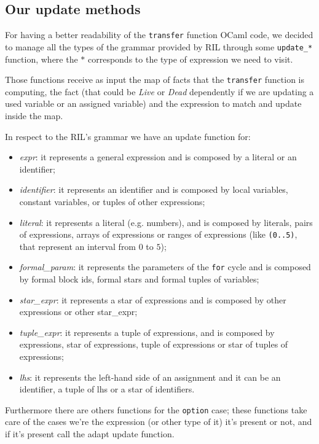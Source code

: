 \documentclass[a4paper]{article}   %
\begin{document}
\pagebreak

\subsection{Our update methods}
For having a better readability of the \texttt{transfer} function OCaml code, we decided to manage all the types of the grammar provided by RIL through some \texttt{update\_*} function, where the $*$ corresponds to the type of expression we need to visit.

Those functions receive as input the map of facts that the \texttt{transfer} function is computing, the fact (that could be \emph{Live} or \emph{Dead} dependently if we are updating a used variable or an assigned variable) and the expression to match and update inside the map.

In respect to
%
the RIL's grammar we have an update function for:
\begin{itemize}
\item \emph{expr}: it represents a general expression and is composed by a literal or an identifier;
\item \emph{identifier}: it represents an identifier and is composed by local variables, constant variables, or tuples of other expressions;
\item \emph{literal}: it represents a literal (e.g. numbers), and is composed by literals, pairs of expressions, arrays of expressions or ranges of expressions (like \texttt{(0..5)}, that represent an interval from $0$ to $5$);
\item \emph{formal\_param}: it represents the parameters of the \texttt{for} cycle and is composed by formal block ids, formal stars and formal tuples of variables;
\item \emph{star\_expr}: it represents a star of expressions and is composed by other expressions or other star\_expr;
\item \emph{tuple\_expr}: it represents a tuple of expressions, and is composed by expressions, star of expressions, tuple of expressions or star of tuples of expressions;
\item \emph{lhs}: it represents the left-hand side of an assignment and it can be an identifier, a tuple of lhs or a star of identifiers.
\end{itemize}
Furthermore there are others functions for the \texttt{option} case; these functions take care of the cases we're the expression (or other type of it) it's present or not, and if it's present call the adapt update function.
\end{document}
